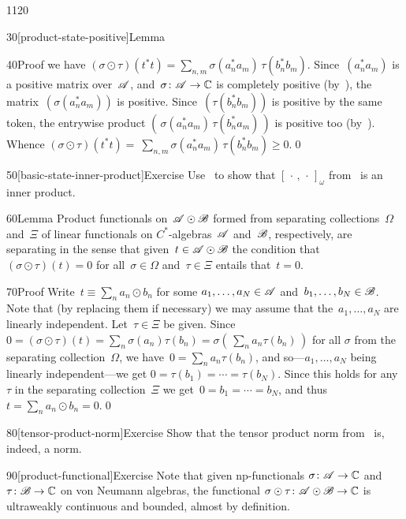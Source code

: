 \begin{parsec}{1120}
\begin{point}{30}[product-state-positive]{Lemma}
\begin{point}{40}{Proof}
we have
$(\sigma\odot\tau)(t^*t)
= \sum_{n,m} \sigma(a_n^*a_m)\,\tau(b_n^*b_m)$.
Since~$(a_n^*a_m)$
is a positive matrix over~$\mathscr{A}$,
and~$\sigma\colon \mathscr{A}\to\mathbb{C}$
is completely positive (by~),
the matrix~$(\sigma(a_n^*a_m))$ is positive.
Since~$(\tau(b_n^*b_m))$
is positive by the same token,
the entrywise product
$(\,\sigma(a_n^*a_m)\,\tau(b_n^*a_m)\,)$
is positive too (by~).
Whence
$(\sigma\odot\tau)(t^*t)
=\ \sum_{n,m} \sigma(a_n^*a_m)\,\tau(b_n^*b_m) \geq 0$.\qed
\end{point}
\end{point}
\begin{point}{50}[basic-state-inner-product]{Exercise}%
Use~ 
to show that
 $[\,\cdot\,,\,\cdot\,]_\omega$
from~
is an inner product.
\end{point}
\begin{point}{60}{Lemma}%
Product functionals on~$\mathscr{A}\odot\mathscr{B}$
formed from 
separating
collections~$\Omega$ and~$\Xi$ 
of linear functionals
on $C^*$-algebras~$\mathscr{A}$ and~$\mathscr{B}$,
respectively,
are separating
in the sense that given~$t\in\mathscr{A}\odot\mathscr{B}$
the condition that $(\sigma\odot \tau)(t)=0$
for all~$\sigma\in \Omega$ and~$\tau\in\Xi$
entails that~$t=0$.
\begin{point}{70}{Proof}%
Write~$t\equiv \sum_n a_n\odot b_n$
for some  $a_1,\dotsc,a_N\in\mathscr{A}$
and~$b_1,\dotsc,b_N\in \mathscr{B}$.
	Note that (by replacing them if necessary)
we may assume that the~$a_1,\dotsc,a_N$
are linearly independent.
Let~$\tau\in\Xi$ be given.
Since~$0=(\sigma\odot \tau)(t)
= \sum_n\sigma(a_n)\tau(b_n)
= \sigma(\,\sum_n a_n\tau(b_n)\,)$
for all $\sigma$ from the separating collection~$\Omega$,
we have~$0=\sum_n a_n\tau(b_n)$,
and so---$a_1,\dotsc,a_N$ being linearly independent---we get
 $0=\tau(b_1)=\dotsb = \tau(b_N)$.
Since this holds for any~$\tau$
in the separating collection~$\Xi$
we get~$0=b_1=\dotsb=b_N$,
and thus~$t=\sum_n a_n\odot b_n=0$.\qed
\end{point}
\end{point}
\begin{point}{80}[tensor-product-norm]{Exercise}%
Show that the tensor product norm
from~
is, indeed, a norm.
\end{point}
\begin{point}{90}[product-functional]{Exercise}%
Note that given np-functionals 
$\sigma \colon \mathscr{A}\to\mathbb{C}$
and~$\tau\colon \mathscr{B}\to\mathbb{C}$
on von Neumann algebras,
the functional $\sigma\odot\tau\colon \mathscr{A}\odot\mathscr{B}\to\mathbb{C}$
is ultraweakly continuous and bounded,
almost by definition.


\end{point}
\end{parsec}
